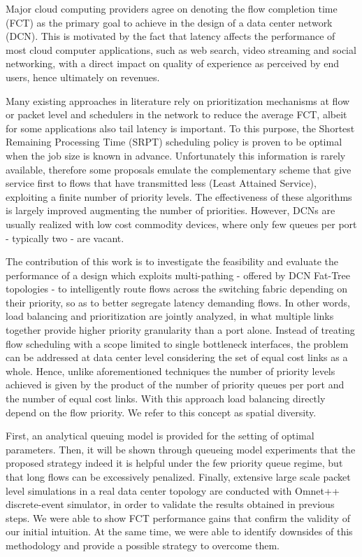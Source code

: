 \abstract
Major cloud computing providers agree on denoting the flow completion time (FCT) as the primary goal to achieve in the design of a data center network (DCN). This is motivated by the fact that latency affects the performance of most cloud computer applications, such as web search, video streaming and social networking, with a direct impact on quality of experience as perceived by end users, hence ultimately on revenues.

Many existing approaches in literature rely on prioritization mechanisms at flow or packet level and schedulers in the network to reduce the average FCT, albeit for some applications also tail latency is important. To this purpose, the Shortest Remaining Processing Time (SRPT) scheduling policy is proven to be optimal when the job size is known in advance. Unfortunately this information is rarely available, therefore some proposals emulate the complementary scheme that give service first to flows that have transmitted less (Least Attained Service), exploiting a finite number of priority levels. The effectiveness of these algorithms is largely improved augmenting the number of priorities. However, DCNs are usually realized with low cost commodity devices, where only few queues per port - typically two - are vacant.

The contribution of this work is to investigate the feasibility and evaluate the performance of a design which exploits multi-pathing - offered by DCN Fat-Tree topologies - to intelligently route flows across the switching fabric depending on their priority, so as to better segregate latency demanding flows. In other words, load balancing and prioritization are jointly analyzed, in what multiple links together provide higher priority granularity than a port alone. Instead of treating flow scheduling with a scope limited to single bottleneck interfaces, the problem can be addressed at data center level considering the set of equal cost links as a whole. Hence, unlike aforementioned techniques the number of priority levels achieved is given by the product of the number of priority queues per port and the number of equal cost links. With this approach load balancing directly depend on the flow priority. We refer to this concept as spatial diversity.

First, an analytical queuing model is provided for the setting of optimal parameters. Then, it will be shown through queueing model experiments that the proposed strategy indeed it is helpful under the few priority queue regime, but that long flows can be excessively penalized. Finally, extensive large scale packet level simulations in a real data center topology are conducted with Omnet++ discrete-event simulator, in order to validate the results obtained in previous steps. We were able to show FCT performance gains that confirm the validity of our initial intuition. At the same time, we were able to identify downsides of this methodology and provide a possible strategy to overcome them.